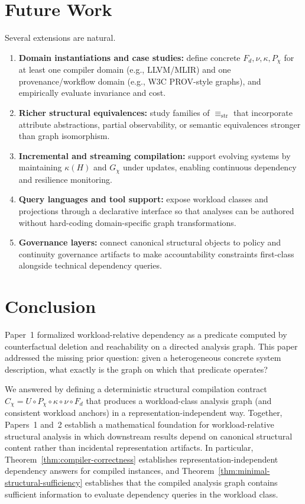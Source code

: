 \documentclass[11pt]{article}
\begin{document}
\section{Future Work}
\label{sec:future-work}

Several extensions are natural.
\begin{enumerate}[label=(\roman*),leftmargin=*]
  \item \textbf{Domain instantiations and case studies:} define concrete $F_d,\nu,\kappa,P_\chi$ for at least one compiler domain (e.g., LLVM/MLIR) and one provenance/workflow domain (e.g., W3C PROV-style graphs), and empirically evaluate invariance and cost.
  \item \textbf{Richer structural equivalences:} study families of $\equiv_{\mathrm{str}}$ that incorporate attribute abstractions, partial observability, or semantic equivalences stronger than graph isomorphism.
  \item \textbf{Incremental and streaming compilation:} support evolving systems by maintaining $\kappa(H)$ and $G_\chi$ under updates, enabling continuous dependency and resilience monitoring.
  \item \textbf{Query languages and tool support:} expose workload classes and projections through a declarative interface so that analyses can be authored without hard-coding domain-specific graph transformations.
  \item \textbf{Governance layers:} connect canonical structural objects to policy and continuity governance artifacts to make accountability constraints first-class alongside technical dependency queries.
\end{enumerate}
\section{Conclusion}
\label{sec:conclusion}

Paper~1 formalized workload-relative dependency as a predicate computed by counterfactual deletion and reachability on a directed analysis graph.
This paper addressed the missing prior question: given a heterogeneous concrete system description, what exactly is the graph on which that predicate operates?

We answered by defining a deterministic structural compilation contract $C_\chi=U\circ P_\chi\circ\kappa\circ\nu\circ F_d$ that produces a workload-class analysis graph (and consistent workload anchors) in a representation-independent way.
Together, Papers~1 and~2 establish a mathematical foundation for workload-relative structural analysis in which downstream results depend on canonical structural content rather than incidental representation artifacts.
In particular, Theorem~\ref{thm:compiler-correctness} establishes representation-independent dependency answers for compiled instances, and Theorem~\ref{thm:minimal-structural-sufficiency} establishes that the compiled analysis graph contains sufficient information to evaluate dependency queries in the workload class.
\end{document}
